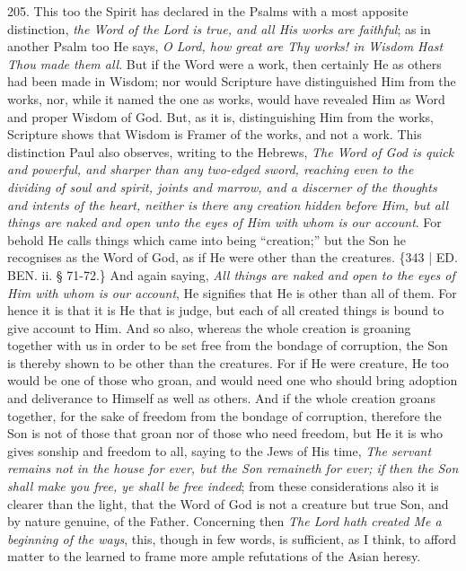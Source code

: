 205. This too the Spirit has
declared in the Psalms with a most apposite distinction, \emph{the Word
of the Lord is true, and all His works are faithful}; as in another
Psalm too He says, \emph{O Lord, how great are Thy works! in Wisdom Hast
Thou made them all}. But if the Word were a work, then certainly He
as others had been made in Wisdom; nor would Scripture have
distinguished Him from the works, nor, while it named the one as
works, would have revealed Him as Word and proper Wisdom of God. But,
as it is, distinguishing Him from the works, Scripture shows that
Wisdom is Framer of the works, and not a work. This distinction Paul
also observes, writing to the Hebrews, \emph{The Word of God is quick and
powerful, and sharper than any two-edged sword, reaching even to the
dividing of soul and spirit, joints and marrow, and a discerner of the
thoughts and intents of the heart, neither is there any creation
hidden before Him, but all things are naked and open unto the eyes of
Him with whom is our account}. For behold He calls things which
came into being ``creation;'' but the Son he recognises as the Word of
God, as if He were other than the creatures. \{343 | ED.
BEN.
ii. § 71-72.\} And again saying, \emph{All things are naked and open to
the eyes of Him with whom is our account}, He signifies that He is
other than all of them. For hence it is that it is He that is judge,
but each of all created things is bound to give account to Him. And so
also, whereas the whole creation is groaning together with us in order
to be set free from the bondage of corruption, the Son is thereby
shown to be other than the creatures. For if He were creature, He too
would be one of those who groan, and would need one who should bring
adoption and deliverance to Himself as well as others. And if the
whole creation groans together, for the sake of freedom from the
bondage of corruption, therefore the Son is not of those that groan
nor of those who need freedom, but He it is who gives sonship and
freedom to all, saying to the Jews of His time, \emph{The servant remains
not in the house for ever, but the Son remaineth for ever; if then the
Son shall make you free, ye shall be free indeed}; from these
considerations also it is clearer than the light, that the Word of God
is not a creature but true Son, and by nature genuine, of the Father.
Concerning then \emph{The Lord hath created Me a beginning of the ways},
this, though in few words, is sufficient, as I think, to afford matter
to the learned to frame more ample refutations of the Asian heresy.

